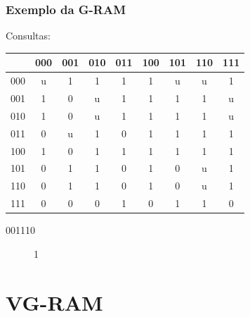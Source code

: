\documentclass{beamer}
\begin{document}
\begin{frame}
    \frametitle{Exemplo da G-RAM}
    Consultas:

    \begin{table}
        \centering
        \begin{tabular}{|c|c|c|c|c|c|c|c|c|}
            \hline
                &       000 &       001 &       010 &       011 &       100 &       101 &       110 &       111\\
            \hline
            000 &        u  &        1  &        1  &        1  &        1  &        u  &        u  &        1 \\
            \hline
            001 &        1  &        0  &        u  &        1  &        1  &        1  &        1  &        u \\
            \hline
            010 &        1  &        0  &        u  &        1  &        1  &        1  &        1  &        u \\
            \hline
            011 &        0  &        u  &        1  &        0  &        1  &        1  &        1  &        1 \\
            \hline
            100 &        1  &        0  &        1  &        1  &        1  &        1  &        1  &        1 \\
            \hline
            101 &        0  &        1  &        1  &        0  &        1  &        0  &        u  &        1 \\
            \hline
            110 &        0  & \alert 1  &        1  &        0  &        1  &        0  &        u  &        1 \\
            \hline
            111 &        0  &        0  &        0  &        1  &        0  &        1  &        1  &        0 \\
            \hline
        \end{tabular}
    \end{table}
    \begin{description}
        \item[001110] 1
    \end{description}
\end{frame}
\section{VG-RAM}
\end{document}
